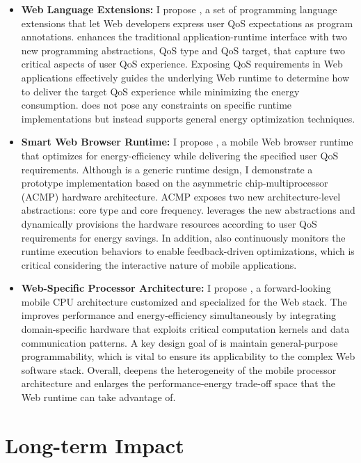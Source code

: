 \begin{itemize}
\item \textbf{Web Language Extensions:} I propose \greenweb, a set of programming language extensions that let Web developers express user QoS expectations as program annotations. \greenweb enhances the traditional application-runtime interface with two new programming abstractions, QoS type and QoS target, that capture two critical aspects of user QoS experience. Exposing QoS requirements in Web applications effectively guides the underlying Web runtime to determine how to deliver the target QoS experience while minimizing the energy consumption. \greenweb does not pose any constraints on specific runtime implementations but instead supports general energy optimization techniques.

\item \textbf{Smart Web Browser Runtime:} I propose \webrt, a  mobile Web browser runtime that optimizes for energy-efficiency while delivering the specified user QoS requirements. Although \webrt is a generic runtime design, I demonstrate a prototype implementation based on the asymmetric chip-multiprocessor (ACMP) hardware architecture. ACMP exposes two new architecture-level abstractions: core type and core frequency. \webrt leverages the new abstractions and dynamically provisions the hardware resources according to user QoS requirements for energy savings. In addition, \webrt also continuously monitors the runtime execution behaviors to enable feedback-driven optimizations, which is critical considering the interactive nature of mobile applications.

\item \textbf{Web-Specific Processor Architecture:} I propose \webcore, a forward-looking mobile CPU architecture customized and specialized for the Web stack. The \webcore improves performance and energy-efficiency simultaneously by integrating domain-specific hardware that exploits critical computation kernels and data communication patterns. A key design goal of \webcore is maintain general-purpose programmability, which is vital to ensure its applicability to the complex Web software stack. Overall, \webcore deepens the heterogeneity of the mobile processor architecture and enlarges the performance-energy trade-off space that the Web runtime can take advantage of.
\end{itemize}

\section{Long-term Impact}
\label{sec:intro:impact}

